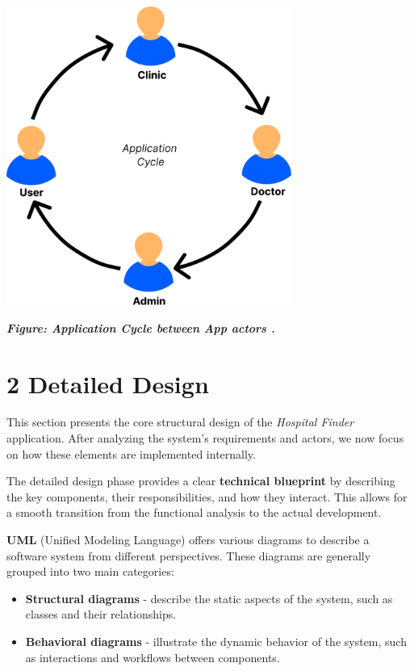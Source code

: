 \documentclass[12pt]{report}
\begin{document}
\vspace*{0.6cm}
\begin{center}
	\includegraphics[width=0.7\textwidth]{images/AppCycle.pdf}
\end{center}
\vspace{0.1cm}
\begin{center}
	\textit{\textbf{Figure: Application Cycle between App actors .}}
\end{center}
\vspace{0.5cm}

\section*{2 Detailed Design}

This section presents the core structural design of the \textit{Hospital Finder} application. After analyzing the system’s requirements and actors, we now focus on how these elements are implemented internally.

\noindent The detailed design phase provides a clear \textbf{technical blueprint} by describing the key components, their responsibilities, and how they interact. This allows for a smooth transition from the functional analysis to the actual development.

\noindent \textbf{UML} (Unified Modeling Language) offers various diagrams to describe a software system from different perspectives. These diagrams are generally grouped into two main categories:


\begin{itemize}
	\item \textbf{Structural diagrams} - describe the static aspects of the system, such as classes and their relationships.
	\item \textbf{Behavioral diagrams} - illustrate the dynamic behavior of the system, such as interactions and workflows between components.
\end{itemize}
\end{document}
